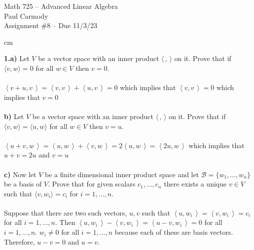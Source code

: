 \documentclass[11pt]{amsart}
\theoremstyle{definition}  %
\begin{document}
\begin{center}
\Large{Math 725 -- Advanced Linear Algebra}\\
\large{Paul Carmody}\\
Assignment \#8 -- Due 11/3/23
\end{center}

 cm

\newcommand{\IP}[1]{\left\langle #1 \,\right\rangle}
\newcommand{\trace}{\mathrm{tr}}
\noindent
{\bf 1.a)} Let $V$ be a vector space with an inner product $\langle \, , \, \rangle$ on it. Prove that if $\langle v, w \rangle = 0$ for all $w \in V$ then $v = 0$. \\
\\
$\IP{v+u,v} = \IP{v,v}+\IP{u,v}=0$ which implies that $\IP{v,v}=0$ which implies that $v=0$\\
\\
{\bf b)} Let $V$ be a vector space with an inner product $\langle \, , \, \rangle$ on it. Prove that if $\langle v, w \rangle = \langle u, w \rangle$ for all $w \in V$ then $v = u$. \\
\\
$\IP{u+v,w} = \IP{u,w}+\IP{v,w} = 2\IP{u,w}=\IP{2u,w}$ which implies that $u+v=2u$ and $v=u$\\
\\
{\bf c)} Now let $V$ be a finite dimensional inner product space and let $\mathcal{B} = \{ w_1, \ldots, w_n \}$ be a basis of $V$. Prove that for given scalars 
$c_1, \ldots, c_n$ there exists a unique $v \in V$ such that $\langle v , w_i \rangle = c_i$ for $i=1, \ldots, n$.  \\
\\
Suppose that there are two such vectors, $u,v$ such that $\IP{u,w_i}=\IP{v,w_i} =c_i$ for all $i=1,\dots,n$.  Then $\IP{u,w_i}-\IP{v,w_i}=\IP{u-v,w_i}=0$ for all $i=1,\dots,n$. $w_i\ne 0$ for all $i=1,\dots,n$ because each of these are basis vectors.  Therefore, $u-v=0$ and $u=v$.\\
\\
\end{document}
